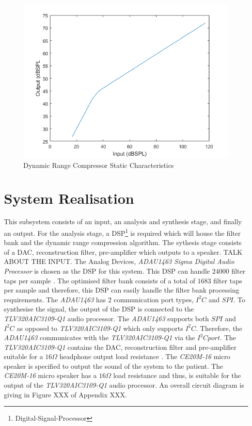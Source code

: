 \documentclass[11pt,onecolumn]{witseiepaper}
\begin{document}
\begin{figure}[h]
\centering
\includegraphics[width=0.6\linewidth]{staticChar.PNG}
\caption{Dynamic Range Compressor Static Characteristics}
\label{fig:staticChar}
\end{figure}

\section{System Realisation}

\noindent This subsystem consists of an input, an analysis and synthesis stage, and finally an output. For the analysis stage, a DSP\footnote{Digital-Signal-Processor} is required which will house the filter bank and the dynamic range compression algorithm. The sythesis stage consists of a DAC, reconstruction filter, pre-amplifier which outputs to a speaker.  TALK ABOUT THE INPUT. The Analog Devices, \textit{ADAU1463 Sigma Digital Audio Processor} is chosen as the DSP for this system. This DSP can handle $24000$ filter taps per sample \cite{dsp}. The optimised filter bank consists of a total of $1683$ filter taps per sample and therefore, this DSP can easily handle the filter bank processing requirements. The \textit{ADAU1463} has $2$ communication port types, $I^2C$ and $SPI$.  To synthesise the signal, the output of the DSP is connected to the \textit{TLV320AIC3109-Q1} audio processor. The \textit{ADAU1463} supports both $SPI$ and $I^2C$ as opposed to \textit{TLV320AIC3109-Q1} which only supports $I^2C$. Therefore, the \textit{ADAU1463} communicates with the \textit{TLV320AIC3109-Q1} via the $I^2C port$. The \textit{TLV320AIC3109-Q1} contains the DAC, reconstruction filter and pre-amplifier suitable for a $16 \Omega$ headphone output load resistance \cite{dac}. The \textit{CE20M-16} micro speaker is specified to output the sound of the system to the patient. The \textit{CE20M-16} micro speaker has a $16 \Omega$ load resistance \cite{speaker} and thus, is suitable for the output of the \textit{TLV320AIC3109-Q1} audio processor. An overall circuit diagram is giving in Figure XXX of Appendix XXX.
\end{document}

